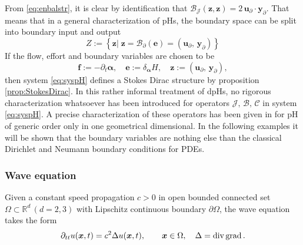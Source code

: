 From \eqref{eq:enbalstr}, it is clear by identification that $\mathcal{B}_{\mathcal{J}}(\bm{z}, \bm{z}) = 2\,  \bm{u}_\partial \cdot \bm{y}_\partial$. That means that in a general characterization of pHs, the boundary space can be split into boundary input and output
\[
{Z} := \left\{ \bm{z} \vert \; \bm{z} = \mathcal{B}_{\partial}(\bm{e}) = (\bm{u}_\partial, \, \bm{y}_\partial) \right\}
\]
If the flow, effort and boundary variables are chosen to be
\[ 
\bm{f}:= -\partial_t \bm{\alpha}, \quad \bm{e}:=\delta_{\bm\alpha} H, \quad \bm{z}:=(\bm{u}_\partial, \, \bm{y}_\partial), 
\]
then system \eqref{eq:syspH} defines a Stokes Dirac structure by proposition \ref{prop:StokesDirac}.  In this rather informal treatment of dpHs, no rigorous characterization whatsoever has been introduced for operators $\mathcal{J,\, B,\, C}$ in system \eqref{eq:syspH}. A precise characterization of these operators has been given in \cite{legorrec2005} for pH of generic order only in one geometrical dimensional. In the following examples it will be shown that the boundary variables are nothing else than the classical Dirichlet and Neumann boundary conditions for PDEs.

\subsubsection{Wave equation}\label{sec:waveeq}
Given a constant speed propagation $c>0$ in open bounded connected set $\Omega \subset \mathbb{R}^d \, (d=2,3)$ with Lipschitz continuous boundary $\partial\Omega$, the wave equation takes the form 
\begin{equation}\label{eq:waveeq}
\partial_{tt} u(\bm{x}, t) = c^2 \Delta u(\bm{x}, t), \qquad \bm{x}\in \Omega, \quad \Delta = \operatorname{div}\operatorname*{grad}.
\end{equation}

